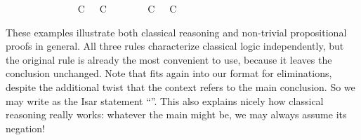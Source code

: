 \begin{isabellebody}
\ {}\ \isamarkupfalse%
\isanewline
\ \ \ \ \isamarkupfalse%
\isanewline
\ \ \ \ \isamarkupfalse%
\ \isamarkupfalse%
\ {}C\ {}\ {}\ C{}\ \isamarkupfalse%
\isanewline
\ \ \ \ \isamarkupfalse%
\ {}{}\ {}C\ {}\ {}\ C{}{}\ \isamarkupfalse%
\ {}\ \isamarkupfalse%
\isanewline
\ \ \isamarkupfalse%
\isanewline
{}\isamarkupfalse%
%
\endisatagproof
{\isafoldproof}%
%
\isadelimproof
%
\endisadelimproof
%
\begin{isamarkuptext}%
\noindent These examples illustrate both classical reasoning and
  non-trivial propositional proofs in general.  All three rules
  characterize classical logic independently, but the original rule is
  already the most convenient to use, because it leaves the conclusion
  unchanged.  Note that  fits again into our
  format for eliminations, despite the additional twist that the
  context refers to the main conclusion.  So we may write  as the Isar statement ``''.
  This also explains nicely how classical reasoning really works:
  whatever the main  might be, we may always assume its
  negation!%
\end{isamarkuptext}%
\isamarkuptrue%
\isamarkupfalse%
%
\end{isabellebody}
